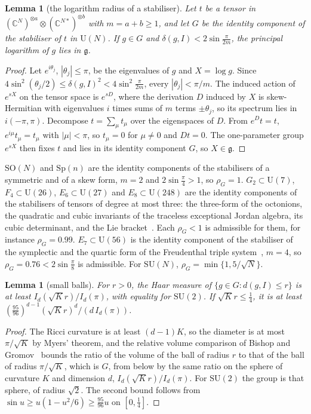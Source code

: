 \documentclass[11pt]{amsart}
\newtheorem{lemma}[theorem]{Lemma}
\theoremstyle{definition}
\theoremstyle{remark}
\numberwithin{equation}{section}
\newcommand{\C}{\mathbb{C}}
\newcommand{\SU}{\mathrm{SU}}
\newcommand{\SO}{\mathrm{SO}}
\newcommand{\U}{\mathrm{U}}
\newcommand{\g}{\mathfrak{g}}
\begin{document}
\begin{lemma}[the logarithm radius of a stabiliser]\label{lem:tensorlog}
Let $t$ be a tensor in $(\C^N)^{\otimes a}\otimes(\C^{N*})^{\otimes b}$
with $m=a+b\ge1$, and let $G$ be the identity component of the stabiliser
of $t$ in $\U(N)$. If $g\in G$ and $\delta(g,I)<2\sin\frac\pi{2m}$, the
principal logarithm of $g$ lies in $\g$.
\end{lemma}

\begin{proof}
Let $e^{i\theta_j}$, $|\theta_j|\le\pi$, be the eigenvalues of $g$ and
$X=\log g$. Since $4\sin^2(\theta_j/2)\le\delta(g,I)^2<4\sin^2\frac\pi
{2m}$, every $|\theta_j|<\pi/m$. The induced action of $e^{sX}$ on the
tensor space is $e^{sD}$, where the derivation $D$ induced by $X$ is
skew-Hermitian with eigenvalues $i$ times sums of $m$ terms $\pm\theta_j$,
so its spectrum lies in $i(-\pi,\pi)$. Decompose $t=\sum_\mu t_\mu$ over the
eigenspaces of $D$. From $e^Dt=t$, $e^{i\mu}t_\mu=t_\mu$ with $|\mu|<\pi$,
so $t_\mu=0$ for $\mu\ne0$ and $Dt=0$. The one-parameter group $e^{sX}$
then fixes $t$ and lies in its identity component $G$, so $X\in\g$.
\end{proof}

$\SO(N)$ and $\mathrm{Sp}(n)$ are the identity components of the
stabilisers of a symmetric and of a skew form, $m=2$ and $2\sin\frac\pi4
>1$, so $\rho_G=1$. $G_2\subset\U(7)$, $F_4\subset\U(26)$, $E_6\subset
\U(27)$ and $E_8\subset\U(248)$ are the identity components of the
stabilisers of tensors of degree at most three: the three-form of the
octonions, the quadratic and cubic invariants of the traceless exceptional
Jordan algebra, its cubic determinant, and the Lie bracket~\cite{Bae02}.
Each $\rho_G<1$ is admissible for them, for instance $\rho_G=0.99$.
$E_7\subset\U(56)$ is the identity component of the stabiliser of the
symplectic and the quartic form of the Freudenthal triple
system~\cite{Bae02}, $m=4$, so $\rho_G=0.76<2\sin\frac\pi8$ is admissible.
For $\SU(N)$, $\rho_G=\min\{1,5/\sqrt N\}$.

\begin{lemma}[small balls]\label{lem:haarball}
For $r>0$, the Haar measure of $\{g\in G:d(g,I)\le r\}$ is at least
$I_d(\sqrt Kr)/I_d(\pi)$, with equality for $\SU(2)$. If $\sqrt Kr\le
\frac14$, it is at least $(\frac{95}{96})^{d-1}(\sqrt Kr)^d/(d\,I_d(\pi))$.
\end{lemma}

\begin{proof}
The Ricci curvature is at least $(d-1)K$, so the diameter is at most
$\pi/\sqrt K$ by Myers' theorem, and the relative volume comparison of
Bishop and Gromov~\cite{Pet16} bounds the ratio of the volume of the ball
of radius $r$ to that of the ball of radius $\pi/\sqrt K$, which is $G$,
from below by the same ratio on the sphere of curvature $K$ and dimension
$d$, $I_d(\sqrt Kr)/I_d(\pi)$. For $\SU(2)$ the group is that sphere,
of radius $\sqrt2$. The second bound follows from $\sin u\ge u(1-u^2/6)
\ge\frac{95}{96}u$ on $[0,\frac14]$.
\end{proof}
\end{document}
